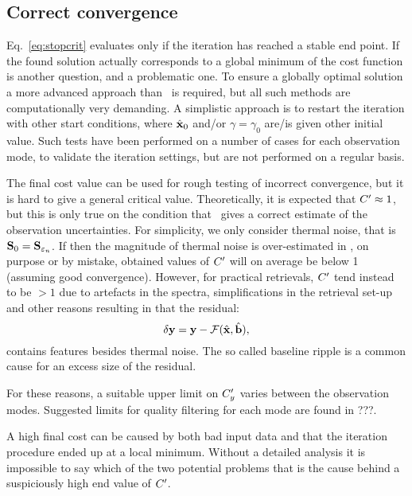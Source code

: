 \subsection{Correct convergence}
%
Eq.~\ref{eq:stopcrit} evaluates only if the iteration has reached a stable end
point. If the found solution actually corresponds to a global minimum of the
cost function is another question, and a problematic one. To ensure a globally
optimal solution a more advanced approach than \LM\ is required, but all
such methods are computationally very demanding. A simplistic approach is to
restart the iteration with other start conditions, where $\hat{\mathbf{x}}_0$ and/or
$\gamma=\gamma_0$ are/is given other initial value. Such tests have been
performed on a number of cases for each observation mode, to validate the
iteration settings, but are not performed on a regular basis.

The final cost value can be used for rough testing of incorrect convergence,
but it is hard to give a general critical value. Theoretically, it is expected
that $C'\approx1$, but this is only true on the condition that
\ gives a correct estimate of the observation uncertainties. For
simplicity, we only consider thermal noise, that is
$\mathbf{S}_{0}=\mathbf{S}_{\varepsilon_n}$. If then the magnitude of thermal noise is
over-estimated in , on purpose or by mistake, obtained values of
$C'$  will on average be below 1 (assuming good convergence). However, for
practical retrievals, $C'$ tend instead to be $>1$ due to artefacts in
the spectra, simplifications in the retrieval set-up and other reasons
resulting in that the residual:
\begin{equation}
  \label{eq:dy}
  \delta\mathbf{y} = \mathbf{y}-\mathcal{F}(\hat{\mathbf{x}},\hat{\mathbf{b}}),
\end{equation}
contains features besides thermal noise. The so called baseline ripple is a common
cause for an excess size of the residual.

For these reasons, a suitable upper limit on $C_y'$ varies between the
observation modes. Suggested limits for quality filtering for each mode are
found in ???.

A high final cost can be caused by both bad input data and that the iteration
procedure ended up at a local minimum. Without a detailed analysis it is
impossible to say which of the two potential problems that is the cause behind
a suspiciously high end value of $C'$.


